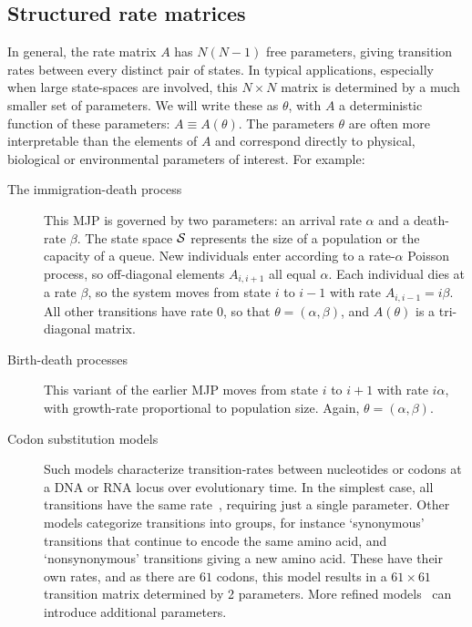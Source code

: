 \subsection{Structured rate matrices}
In general, the rate matrix $A$ has $N(N-1)$ free parameters,
giving transition rates between every distinct pair of states. 
In typical applications, especially when large state-spaces
are involved, this $N \times N$ matrix is determined by a much smaller
set of parameters. We will write these as $\theta$, with
$A$ a deterministic function of these parameters: 
$A \equiv A(\theta)$. The parameters $\theta$ are often more 
interpretable than the elements of $A$ and correspond directly to
physical, biological or environmental parameters of interest. 
For example:
\begin{description}
  \item[The immigration-death process] This MJP is governed
    by two parameters: an arrival rate $\alpha$ and a death-rate
    $\beta$. The state space ${\mathcal S}$ represents the size of a 
    population or the capacity of a queue. New individuals
    enter according to a rate-$\alpha$ Poisson process,
    so off-diagonal elements $A_{i,i+1}$ all equal $\alpha$.
    Each individual dies %
    at a rate $\beta$, so the system moves from state $i$ to 
    $i-1$ with rate $A_{i,i-1}=i\beta$.
    All other transitions have rate $0$, so that $\theta = (\alpha,\beta)$,
    and $A(\theta)$ is a tri-diagonal matrix.
  \item[Birth-death processes] This variant of the
    earlier MJP moves from state $i$ 
    to $i+1$ with rate $i\alpha$, with growth-rate proportional to 
    population size. Again, 
    $\theta=(\alpha,\beta)$.
  \item[Codon substitution models] Such models %
    characterize transition-rates between nucleotides or codons at a 
    DNA or RNA locus %
    over evolutionary time. In the simplest case,
    all transitions have the same rate~\cite{jukescantor69}, 
    requiring just a single parameter. Other models categorize transitions 
    into groups, for instance `synonymous' transitions that continue to 
    encode the same amino acid, and `nonsynonymous' transitions giving 
    a new amino acid.  These have their own rates, and as 
    there are $61$ codons, this model results in a 
    $61\times 61$ transition matrix determined by 2 parameters. More refined 
    models~\cite{goldman1994codon} can introduce additional parameters. 
\end{description}
